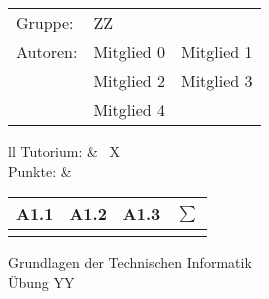 \documentclass[12pt,a4paper,oneside,ngerman]{article}
\newcommand{\fach}{Grundlagen der Technischen Informatik}
\newcommand{\dokumentenTitel}{Übung YY }
\newcommand{\tutorium}{X }
\newcommand{\memberOne}{Mitglied 0}
\newcommand{\memberTwo}{Mitglied 1}
\newcommand{\memberThree}{Mitglied 2}
\newcommand{\memberFour}{Mitglied 3}
\newcommand{\memberFive}{Mitglied 4}
\newcommand{\group} {ZZ}
\begin{document}
	\thispagestyle{plain} %
	
	\begin{multicols}{2} %
		\hspace{-1cm} %
		\begin{tabular}{lll} %
			Gruppe: & \group & \\
			Autoren: & \memberOne & \memberTwo \\ %
			& \memberThree & \memberFour \\
			& \memberFive & \\
		\end{tabular}
		
		\columnbreak %
		\hspace{-3cm} %
		\raggedleft \begin{tabular}{ll}
			Tutorium: &  \ \tutorium \\
			Punkte: &     
			\renewcommand{\arraystretch}{1.2} %
			
			\begin{tabular}{|p{0.8cm}|p{0.8cm}|p{0.8cm}|p{0.8cm}|} %
				\hline A1.1 & A1.2 & A1.3 & $\sum\limits^{ }$ \\ \hline %
				& & & \\ \hline   %
			\end{tabular}
		\end{tabular}	
	\end{multicols} %
	
	\begin{center}
		\Large{\fach} \\
		\LARGE{\dokumentenTitel} \\
		\small
    \end{center}
       
\end{document}
